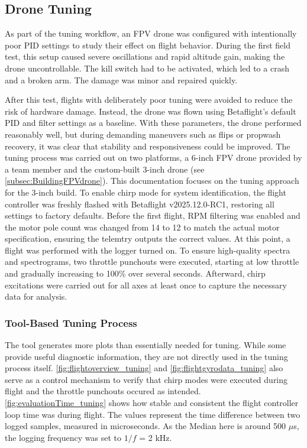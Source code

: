 \documentclass[a4paper,11pt]{scrartcl}
\begin{document}
\subsection{Drone Tuning}
As part of the tuning workflow, an FPV drone was configured with intentionally poor PID settings to study their effect on flight behavior. During the first field test, this setup caused severe oscillations and rapid altitude gain, making the drone uncontrollable. The kill switch had to be activated, which led to a crash and a broken arm. The damage was minor and repaired quickly.
\par
After this test, flights with deliberately poor tuning were avoided to reduce the risk of hardware damage. Instead, the drone was flown using Betaflight’s default PID and filter settings as a baseline. With these parameters, the drone performed reasonably well, but during demanding maneuvers such as flips or propwash recovery, it was clear that stability and responsiveness could be improved.
The tuning process was carried out on two platforms, a 6-inch FPV drone provided by a team member and the custom-built 3-inch drone (see \autoref{subsec:BuildingFPVdrone}). This documentation focuses on the tuning approach for the 3-inch build. To enable chirp mode for system identification, the flight controller was freshly flashed with Betaflight v2025.12.0-RC1, restoring all settings to factory defaults. Before the first flight, RPM filtering was enabled and the motor pole count was changed from 14 to 12 to match the actual motor specification, ensuring the telemtry outputs the correct values.
At this point, a flight was performed with the logger turned on. To ensure high-quality spectra and spectrograms, two throttle punchouts were executed, starting at low throttle and gradually increasing to 100\% over several seconds. Afterward, chirp excitations were carried out for all axes at least once to capture the necessary data for analysis.

\subsubsection*{Tool-Based Tuning Process}

The tool generates more plots than essentially needed for tuning. While some provide useful diagnostic information, they are not directly used in the tuning process itself. \autoref{fig:flightoverview_tuning} and \autoref{fig:flightgyrodata_tuning} also serve as a control mechanism to verify that chirp modes were executed during flight and the throttle punchouts occured as intended. \autoref{fig:evaluationTime_tuning} shows how stable and consistent the flight controller loop time was during flight. The values represent the time difference between two logged samples, measured in microseconds. As the Median here is around 500 $\mu$s, the logging frequency was set to $1/f$ = 2 kHz.
\end{document}
